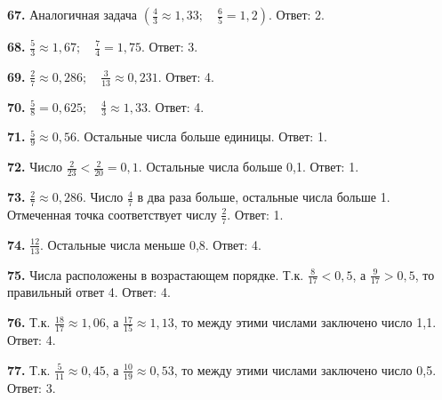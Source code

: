 \textbf{67.}  Аналогичная задача  $\left(\frac{4}{3}\approx1,33;\quad\frac{6}{5}=1,2\right)$. \newline \null \hspace*{\fill} Ответ: 2. 

\textbf{68.} $\frac{5}{3}\approx1,67;\quad\frac{7}{4}=1,75$. \newline \null \hspace*{\fill} Ответ: 3.

\textbf{69.}  $\frac{2}{7}\approx0,286;\quad\frac{3}{13}\approx0,231$. \newline \null \hspace*{\fill} Ответ: 4.   

\textbf{70.} $\frac{5}{8}=0,625;\quad\frac{4}{3}\approx1,33$. \newline \null \hspace*{\fill} Ответ: 4. 

\textbf{71.} $\frac{5}{9}\approx0,56$. Остальные числа больше единицы. \newline \null \hspace*{\fill} Ответ: 1. 

\textbf{72.} Число $\frac{2}{23}<\frac{2}{20}=0,1$. Остальные числа больше 0,1. \newline \null \hspace*{\fill} Ответ: 1. 

\textbf{73.} $\frac{2}{7}\approx0,286$. Число $\frac{4}{7}$ в два раза больше, остальные числа больше 1. Отмеченная точка соответствует числу $\frac{2}{7}$. \newline \null \hspace*{\fill} Ответ: 1. 

\textbf{74.} $\frac{12}{13}$. Остальные числа меньше 0,8. \newline \null \hspace*{\fill} Ответ: 4. 

\textbf{75.} Числа расположены в возрастающем порядке. Т.к. $\frac{8}{17}<0,5$, а $\frac{9}{17}>0,5$, то правильный ответ 4. \newline \null \hspace*{\fill} Ответ: 4. 

\textbf{76.}  Т.к. $\frac{18}{17}\approx1,06$, а $\frac{17}{15}\approx1,13$, то между этими числами заключено число 1,1. \newline \null \hspace*{\fill} Ответ: 4.

\textbf{77.}  Т.к. $\frac{5}{11}\approx0,45$, а $\frac{10}{19}\approx0,53$, то между этими числами заключено число 0,5. \newline \null \hspace*{\fill} Ответ: 3. 

